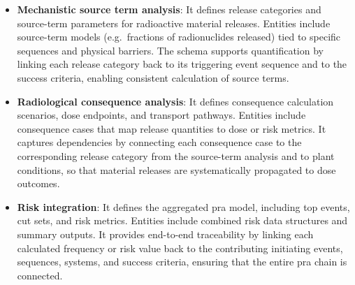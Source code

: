 \begin{itemize}
  \item \textbf{Mechanistic source term analysis}: It defines release categories and source-term parameters for radioactive material releases.  Entities include source-term models (e.g.\ fractions of radionuclides released) tied to specific sequences and physical barriers.  The schema supports quantification by linking each release category back to its triggering event sequence and to the success criteria, enabling consistent calculation of source terms.
  \item \textbf{Radiological consequence analysis}: It defines consequence calculation scenarios, dose endpoints, and transport pathways.  Entities include consequence cases that map release quantities to dose or risk metrics.  It captures dependencies by connecting each consequence case to the corresponding release category from the source-term analysis and to plant conditions, so that material releases are systematically propagated to dose outcomes.
  \item \textbf{Risk integration}: It defines the aggregated \acrshort{pra} model, including top events, cut sets, and risk metrics.  Entities include combined risk data structures and summary outputs.  It provides end-to-end traceability by linking each calculated frequency or risk value back to the contributing initiating events, sequences, systems, and success criteria, ensuring that the entire \acrshort{pra} chain is connected.
\end{itemize}
